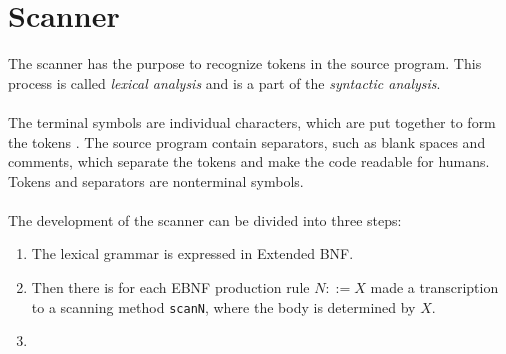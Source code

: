 \section{Scanner}
The scanner has the purpose to recognize tokens in the source program. This process is called \textit{lexical analysis} and is a part of the \textit{syntactic analysis}.
\\
\\
The terminal symbols are individual characters, which are put together to form the tokens \cite{misc:spo}. The source program contain separators, such as blank spaces and comments, which separate the tokens and make the code readable for humans. Tokens and separators are nonterminal symbols.
\\
\\
The development of the scanner can be divided into three steps:
\begin{enumerate}
\item The lexical grammar is expressed in Extended BNF.
\item Then there is for each EBNF production rule $N::=X$ made a transcription to a scanning method \texttt{scanN}, where the body is determined by $X$.
\item %
\end{enumerate}